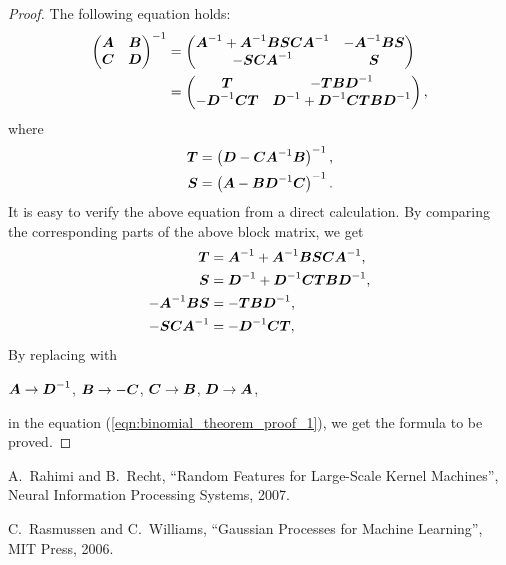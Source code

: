 \documentclass[twocolumn,a4paper,10pt]{article}
\begin{document}
\begin{proof}
The following equation holds:
\begin{align*}
    \begin{pmatrix}
        \boldsymbol{A} & \boldsymbol{B} \\
        \boldsymbol{C} & \boldsymbol{D}
    \end{pmatrix}^{-1}
    &= \begin{pmatrix}
        \boldsymbol{A}^{-1} + \boldsymbol{A}^{-1} \boldsymbol{BSCA}^{-1} & - \boldsymbol{A}^{-1} \boldsymbol{BS} \\
        - \boldsymbol{SCA}^{-1}                         & \boldsymbol{S}
    \end{pmatrix} \\
    &= \begin{pmatrix}
        \boldsymbol{T}                & -\boldsymbol{TBD}^{-1} \\
        - \boldsymbol{D}^{-1} \boldsymbol{CT} & \boldsymbol{D}^{-1} + \boldsymbol{D}^{-1} \boldsymbol{CTBD}^{-1}
    \end{pmatrix},
\end{align*}
where
\begin{align}
    \boldsymbol{T} &= \left( \boldsymbol{D} - \boldsymbol{CA}^{-1} \boldsymbol{B} \right)^{-1}, \\
    \boldsymbol{S} &= \left( \boldsymbol{A} - \boldsymbol{BD}^{-1} \boldsymbol{C} \right)^{-1}.
\end{align}
It is easy to verify the above equation from a direct calculation.
By comparing the corresponding parts of the above block matrix, we get
\begin{align}
    \boldsymbol{T} &= \boldsymbol{A}^{-1} + \boldsymbol{A}^{-1} \boldsymbol{BSCA}^{-1},
    \label{eqn:binomial_theorem_proof_1} \\
    \boldsymbol{S} &= \boldsymbol{D}^{-1} + \boldsymbol{D}^{-1} \boldsymbol{CTBD}^{-1}, \\
    - \boldsymbol{A}^{-1} \boldsymbol{BS} &= - \boldsymbol{TBD}^{-1}, \\
    - \boldsymbol{SCA}^{-1} &= - \boldsymbol{D}^{-1} \boldsymbol{CT},
\end{align}
By replacing with
\begin{center}
    $\boldsymbol{A} \to \boldsymbol{D}^{-1}$, \hspace{5pt}
    $\boldsymbol{B} \to -\boldsymbol{C}$, \hspace{5pt}
    $\boldsymbol{C} \to \boldsymbol{B}$, \hspace{5pt}
    $\boldsymbol{D} \to \boldsymbol{A}$,
\end{center}
in the equation (\ref{eqn:binomial_theorem_proof_1}), we get the formula to be proved.
\end{proof}


\pagebreak

\begin{thebibliography}{9}

    A.~Rahimi and B.~Recht, 
    ``Random Features for Large-Scale Kernel Machines'',
    Neural Information Processing Systems, 2007.

    C.~Rasmussen and C.~Williams, ``Gaussian Processes for Machine Learning'', MIT Press, 2006.

\end{thebibliography}
\end{document}
